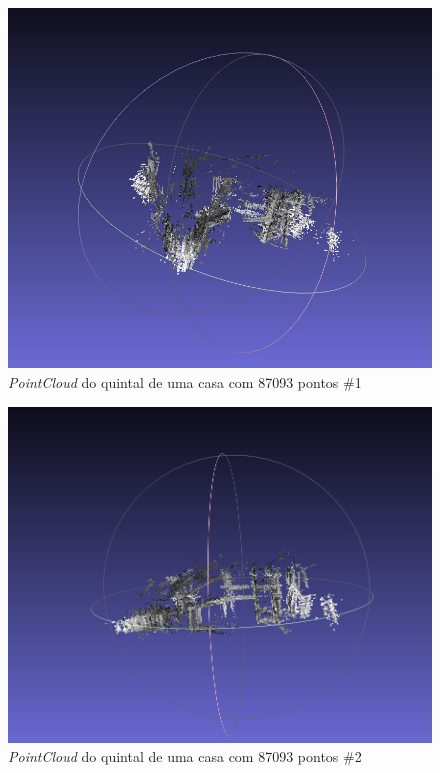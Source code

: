 \begin{figure}[H]
	\centering
		\includegraphics[width= \textwidth]{Imagens/figura4-10.jpg}
	\caption{\textit{PointCloud} do quintal de uma casa com 87093 pontos \#1}
	\label{fig4:10}
\end{figure}

\begin{figure}[H]
	\centering
		\includegraphics[width= \textwidth]{Imagens/figura4-11.jpg}
	\caption{\textit{PointCloud} do quintal de uma casa com 87093 pontos \#2}
	\label{fig4:11}
\end{figure}


